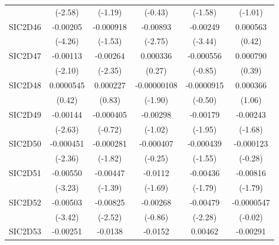 \begin{table}[htbp]
\begin{tabular}{l*{5}{c}}
            &     (-2.58)         &     (-1.19)         &     (-0.43)         &     (-1.58)         &     (-1.01)         \\
SIC2D46     &    -0.00205\sym{***}&   -0.000918         &    -0.00893\sym{**} &    -0.00249\sym{***}&    0.000563         \\
            &     (-4.26)         &     (-1.53)         &     (-2.75)         &     (-3.44)         &      (0.42)         \\
SIC2D47     &    -0.00113\sym{*}  &    -0.00264\sym{*}  &    0.000336         &   -0.000556         &    0.000790         \\
            &     (-2.10)         &     (-2.35)         &      (0.27)         &     (-0.85)         &      (0.39)         \\
SIC2D48     &   0.0000545         &    0.000227         & -0.00000108         &  -0.0000915         &    0.000366         \\
            &      (0.42)         &      (0.83)         &     (-1.90)         &     (-0.50)         &      (1.06)         \\
SIC2D49     &    -0.00144\sym{**} &   -0.000405         &    -0.00298         &    -0.00179         &    -0.00243         \\
            &     (-2.63)         &     (-0.72)         &     (-1.02)         &     (-1.95)         &     (-1.68)         \\
SIC2D50     &   -0.000451\sym{*}  &   -0.000281         &   -0.000407         &   -0.000439         &   -0.000123         \\
            &     (-2.36)         &     (-1.82)         &     (-0.25)         &     (-1.55)         &     (-0.28)         \\
SIC2D51     &    -0.00550\sym{**} &    -0.00447         &     -0.0112         &    -0.00436         &    -0.00816         \\
            &     (-3.23)         &     (-1.39)         &     (-1.69)         &     (-1.79)         &     (-1.79)         \\
SIC2D52     &    -0.00503\sym{***}&    -0.00825\sym{*}  &    -0.00268         &    -0.00479\sym{*}  &  -0.0000547         \\
            &     (-3.42)         &     (-2.52)         &     (-0.86)         &     (-2.28)         &     (-0.02)         \\
SIC2D53     &    -0.00251         &     -0.0138\sym{**} &     -0.0152\sym{*}  &     0.00462         &    -0.00291         \\

\end{tabular}
\end{table}
